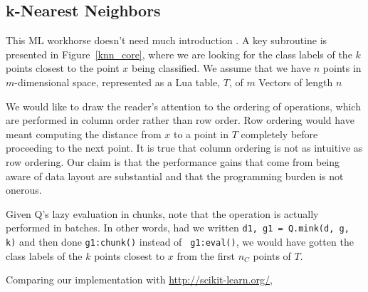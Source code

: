 \newpage
\subsection{k-Nearest Neighbors}
\label{knn}

This ML workhorse doesn't need much introduction \cite{XXXX}. A key subroutine
is presented in Figure~\ref{knn_core}, where we are looking for the class labels of the
\(k\) points closest to the point \(x\) being classified. 
We assume that we have \(n\) points in \(m\)-dimensional space, represented as a
Lua table, \(T\), of \(m\) Vectors of length \(n\)

We would like to draw the
reader's attention to the ordering of operations, which are performed in column
order rather than row order. Row ordering would have meant computing the
distance from \(x\) to a point in \(T\) completely before proceeding to the next
point.
It is true that column ordering is not as intuitive as row ordering. Our claim
is that the performance gains that come from being
aware of data layout are substantial and that the programming burden is not onerous.

Given Q's lazy evaluation in chunks, note that the operation is actually
performed in batches. In other words, had we written 
{\tt d1, g1 = Q.mink(d, g, k)} and then done {\tt g1:chunk()} instead  of {\tt
g1:eval()}, 
we would have gotten the class labels of the \(k\) points
closest to \(x\) from the first \(n_C\) points of \(T\). 


Comparing our implementation with \url{http://scikit-learn.org/}, \TBC

\begin{figure}[hbtp]
\centering
{}
\end{figure}


